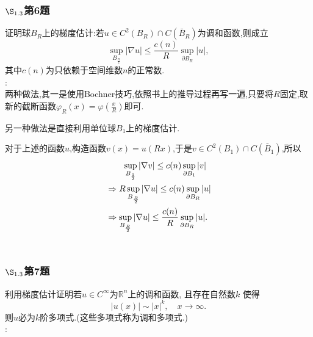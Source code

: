 \documentclass[12pt, a4paper]{ctexart}
\begin{document}
	\subsubsection{$\S_{1.3}$第6题}
	\kaishu{}证明球$B_R$上的梯度估计:若$u \in C^2(B_R) \cap C(\bar{B}_R)$为调和函数,则成立$$
	\sup_{B_{\frac{R}{2}}} |\nabla u| \le \frac{c(n)}{R} \sup_{\partial B_R}|u|,	$$
	其中$c(n)$为只依赖于空间维数$n$的正常数.\\
	
	\songti{}:\\
	
	两种做法,其一是使用Bochner技巧,依照书上的推导过程再写一遍,只要将$R$固定,取新的截断函数$\varphi_R(x)=\varphi\left(\frac{x}{R} \right)$即可.
	
	另一种做法是直接利用单位球$B_1$上的梯度估计.
	
	对于上述的函数$u$,构造函数$v(x)=u(Rx)$,于是$v \in C^2(B_1) \cap C(\bar{B}_1)$,所以
	\begin{align}
	&\qquad \sup_{B_{\frac{1}{2}}} |\nabla v| \le c(n) \sup_{\partial B_1}|v| \notag \\
	&\Rightarrow R \sup_{B_{\frac{R}{2}}} |\nabla u| \le c(n) \sup_{\partial B_R}|u| \notag \\
	&\Rightarrow \sup_{B_{\frac{R}{2}}} |\nabla u| \le \frac{c(n)}{R} \sup_{\partial B_R}|u| \notag.
	\end{align}	\\
    
	\subsubsection{$\S_{1.3}$第7题}
	\kaishu{}利用梯度估计证明若$u \in C^{\infty}$为$\mathbb{R}^n$上的调和函数, 且存在自然数$k$ 使得$$
	|u(x)| \sim |x|^k,\quad x \to \infty.$$
	则$u $必为$k $阶多项式.(这些多项式称为调和多项式.)\\
	
	\songti{}:\\
	
\end{document}
